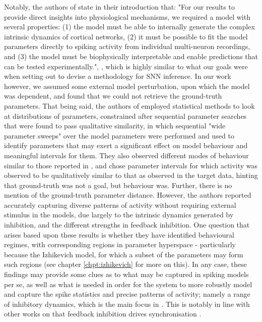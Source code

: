 \documentclass[mphil,deptreport,ianc]{infthesis} %
\begin{document}
Notably, the authors of \cite{Stringer2016InhibitoryNetworks} state in their introduction that: "For our results to provide direct insights into physiological mechanisms, we required a model with several properties: (1) the model must be able to internally generate the complex intrinsic dynamics of cortical networks, (2) it must be possible to fit the model parameters directly to spiking activity from individual multi-neuron recordings, and (3) the model must be biophysically interpretable and enable predictions that can be tested experimentally.", \cite{Stringer2016InhibitoryNetworks}, which is highly similar to what our goals were when setting out to devise a methodology for SNN inference.
In our work however, we assumed some external model perturbation, upon which the model was dependent, and found that we could not retrieve the ground-truth parameters.
That being said, the authors of \cite{Stringer2016InhibitoryNetworks} employed statistical methods to look at distributions of parameters, constrained after sequential parameter searches that were found to pass qualitative similarity, in which sequential "wide parameter sweeps" over the model parameters were performed and used to identify parameters that may exert a significant effect on model behaviour and meaningful intervals for them.
They also observed different modes of behaviour similar to those reported in \cite{Izhikevich2004}, and chose parameter intervals for which activity was observed to be qualitatively similar to that as observed in the target data, hinting that ground-truth was not a goal, but behaviour was.
Further, there is no mention of the ground-truth parameter distance.
However, the authors reported accurately capturing diverse patterns of activity without requiring external stimulus in the models, due largely to the intrinsic dynamics generated by inhibition, and the different strengths in feedback inhibition.
One question that arises based upon these results is whether they have identified behavioural regimes, with corresponding regions in parameter hyperspace - particularly because the Izhikevich model, for which a subset of the parameters may form such regions (see chapter \ref{chpt:izhikevich} for more on this).
In any case, these findings may provide some clues as to what may be captured in spiking models per se, as well as what is needed in order for the system to more robustly model and capture the spike statistics and precise patterns of activity; namely a range of inhibitory dynamics, which is the main focus in \cite{Stringer2016InhibitoryNetworks}.
This is notably in line with other works on that feedback inhibition drives synchronisation \cite{Pastoll2013}.
\end{document}
